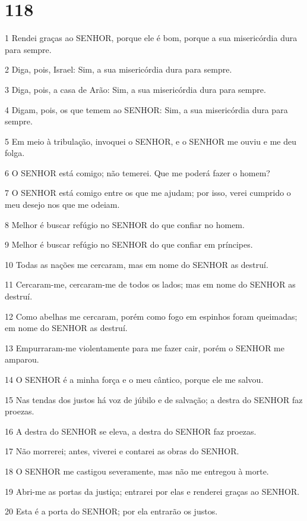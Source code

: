 \chapter{118}

\par 1 Rendei graças ao SENHOR, porque ele é bom, porque a sua misericórdia dura para sempre.
\par 2 Diga, pois, Israel: Sim, a sua misericórdia dura para sempre.
\par 3 Diga, pois, a casa de Arão: Sim, a sua misericórdia dura para sempre.
\par 4 Digam, pois, os que temem ao SENHOR: Sim, a sua misericórdia dura para sempre.
\par 5 Em meio à tribulação, invoquei o SENHOR, e o SENHOR me ouviu e me deu folga.
\par 6 O SENHOR está comigo; não temerei. Que me poderá fazer o homem?
\par 7 O SENHOR está comigo entre os que me ajudam; por isso, verei cumprido o meu desejo nos que me odeiam.
\par 8 Melhor é buscar refúgio no SENHOR do que confiar no homem.
\par 9 Melhor é buscar refúgio no SENHOR do que confiar em príncipes.
\par 10 Todas as nações me cercaram, mas em nome do SENHOR as destruí.
\par 11 Cercaram-me, cercaram-me de todos os lados; mas em nome do SENHOR as destruí.
\par 12 Como abelhas me cercaram, porém como fogo em espinhos foram queimadas; em nome do SENHOR as destruí.
\par 13 Empurraram-me violentamente para me fazer cair, porém o SENHOR me amparou.
\par 14 O SENHOR é a minha força e o meu cântico, porque ele me salvou.
\par 15 Nas tendas dos justos há voz de júbilo e de salvação; a destra do SENHOR faz proezas.
\par 16 A destra do SENHOR se eleva, a destra do SENHOR faz proezas.
\par 17 Não morrerei; antes, viverei e contarei as obras do SENHOR.
\par 18 O SENHOR me castigou severamente, mas não me entregou à morte.
\par 19 Abri-me as portas da justiça; entrarei por elas e renderei graças ao SENHOR.
\par 20 Esta é a porta do SENHOR; por ela entrarão os justos.
